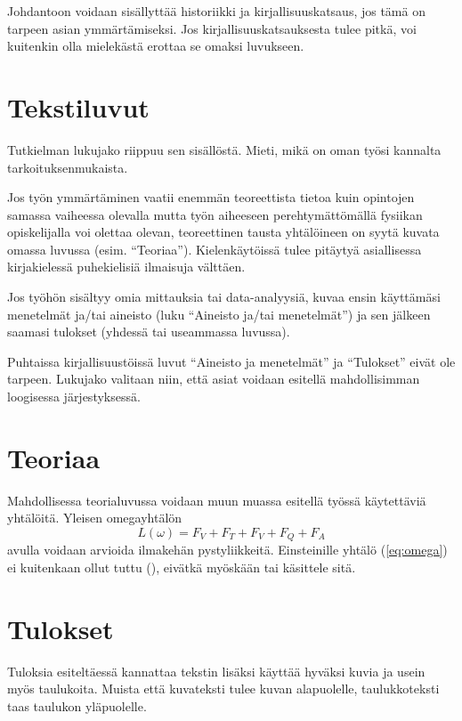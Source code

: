 \documentclass[finnish,twoside,openright,utf]{HYgradu}
\begin{document}
Johdantoon voidaan sisällyttää historiikki ja kirjallisuuskatsaus, jos tämä on tarpeen asian ymmärtämiseksi. Jos kirjallisuuskatsauksesta tulee pitkä, voi kuitenkin olla mielekästä erottaa se omaksi luvukseen.

\section{Tekstiluvut}

Tutkielman lukujako riippuu sen sisällöstä. Mieti, mikä on oman työsi kannalta tarkoituksenmukaista.

Jos työn ymmärtäminen vaatii enemmän teoreettista tietoa kuin  opintojen samassa vaiheessa olevalla mutta työn aiheeseen perehtymättömällä   fysiikan opiskelijalla voi olettaa olevan, teoreettinen tausta yhtälöineen on syytä kuvata omassa luvussa (esim. ``Teoriaa'').
Kielenkäytöissä tulee pitäytyä  asiallisessa kirjakielessä puhekielisiä ilmaisuja välttäen.

Jos työhön sisältyy omia mittauksia tai data-analyysiä, kuvaa ensin käyttämäsi  menetelmät  ja/tai aineisto (luku ``Aineisto ja/tai  menetelmät'') ja sen jälkeen saamasi tulokset (yhdessä tai useammassa luvussa).

Puhtaissa kirjallisuustöissä luvut ``Aineisto ja menetelmät'' ja ``Tulokset'' eivät ole tarpeen. Lukujako valitaan niin, että  asiat  voidaan esitellä mahdollisimman loogisessa järjestyksessä.

\section{Teoriaa}
%
%
Mahdollisessa teorialuvussa voidaan muun muassa esitellä työssä käytettäviä yhtälöitä. Yleisen omegayhtälön
\begin{equation}
\label{eq:omega}
L(\omega)=F_V + F_T + F_V + F_Q + F_A
\end{equation}
avulla voidaan arvioida ilmakehän pystyliikkeitä. Einsteinille  yhtälö (\ref{eq:omega}) ei kuitenkaan ollut tuttu (\cite{einstein}), eivätkä myöskään \cite{latexcompanion} tai \cite{knuthwebsite} käsittele sitä. 

\section{Tulokset}
%
%
Tuloksia esiteltäessä kannattaa tekstin lisäksi käyttää hyväksi kuvia ja usein myös taulukoita. Muista että kuvateksti tulee kuvan alapuolelle, taulukkoteksti taas taulukon yläpuolelle.
\end{document}
